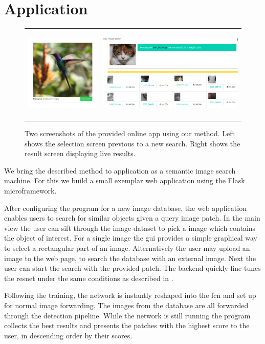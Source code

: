 %
\chapter{Application}
\label{sec:application}
\begin{figure}[h!]
    \begin{tabulary}{\textwidth}{cc}
        \includegraphics[height=4.5cm]{figures/server_select} &
        \includegraphics[height=4.5cm]{figures/server_results}
    \end{tabulary}
    \caption{Two screenshots of the provided online app using our method. Left shows the selection screen previous to a new search. Right shows the result screen displaying live results.}
    \label{fig:application}
\end{figure}
We bring the described method to application as a semantic image search machine. For this we build a small exemplar web application using the Flask microframework.

After configuring the program for a new image database, the web application enables users to search for similar objects given a query image patch. In the main view the user can sift through the image dataset to pick a image which contains the object of interest. For a single image the \gls{gui} provides a simple graphical way to select a rectangular part of an image. Alternatively the user may upload an image to the web page, to search the database with an external image. Next the user can start the search with the provided patch. The backend quickly fine-tunes the \gls{resnet} under the same conditions as described in .

Following the training, the network is instantly reshaped into the \gls{fcn} and set up for normal image forwarding. The images from the database are all forwarded through the detection pipeline. While the network is still running the program collects the best results and presents the patches with the highest score to the user, in descending order by their scores.

